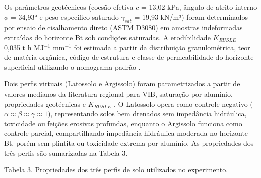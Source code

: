 \documentclass[
  brazilian,
  authoryear,
  preprint]{elsarticle}
\begin{document}
Os parâmetros geotécnicos (coesão efetiva \(c\) = 13,02 kPa, ângulo de
atrito interno \(\phi\) = 34,93° e peso específico saturado
\(\gamma_{sat}\) = 19,93 kN/m³) foram determinados por ensaio de
cisalhamento direto (ASTM D3080) em amostras indeformadas extraídas do
horizonte Bt sob condições saturadas. A erodibilidade \(K_{RUSLE}\) =
0,035 t h MJ\(^{-1}\) mm\(^{-1}\) foi estimada a partir da distribuição
granulométrica, teor de matéria orgânica, código de estrutura e classe
de permeabilidade do horizonte superficial utilizando o nomograma padrão
\citep{wischmeier_et_al_1971}.

Dois perfis virtuais (Latossolo e Argissolo) foram parametrizados a
partir de valores medianos da literatura regional para VIB, saturação
por alumínio, propriedades geotécnicas e \(K_{RUSLE}\)
\citep{silva_et_al_2009, bertoni_lombardi_neto_2017}. O Latossolo opera
como controle negativo
(\(\alpha \approx \beta \approx \gamma \approx 1\)), representando solos
bem drenados sem impedância hidráulica, toxicidade ou feições erosivas
profundas, enquanto o Argissolo funciona como controle parcial,
compartilhando impedância hidráulica moderada no horizonte Bt, porém sem
plintita ou toxicidade extrema por alumínio. As propriedades dos três
perfis são sumarizadas na Tabela 3.

Tabela 3. Propriedades dos três perfis de solo utilizados no
experimento.
\end{document}
